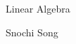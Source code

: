 \documentclass[linearalgebra]{subfiles}
\begin{document}
    \begin{titlepage}
    \centering
    \vspace*{8cm}
    {\serifastd\Huge Linear Algebra \par}
    \vspace{1cm}
    {\serifastd\Large Snochi Song\par}
    \vspace{2.5cm}
    \algebraicon
    \vspace*{\fill}
    \cleardoublepage
    \end{titlepage}

    \toc
\end{document}
